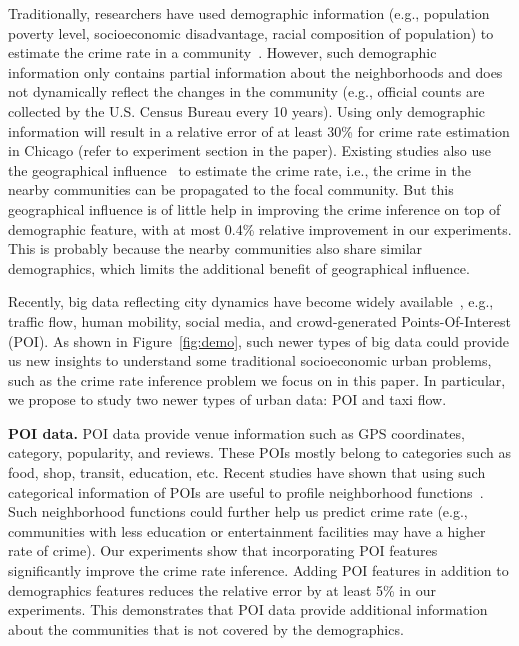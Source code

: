 Traditionally, researchers have used demographic information (e.g., population poverty level, socioeconomic disadvantage, racial composition of population) to estimate the crime rate in a community~\cite{GrSa09}. However,  such demographic information only contains partial information about the neighborhoods and does not dynamically reflect the changes in the community (e.g., official counts are collected by the U.S. Census Bureau every 10 years). Using only demographic information will result in a relative error of at least 30\% for crime rate estimation in Chicago (refer to experiment section in the paper). Existing studies also use the geographical influence~\cite{Ans02} to estimate the crime rate, i.e., the crime in the nearby communities can be propagated to the focal community. But this geographical influence is of little help in improving the crime inference on top of demographic feature, with at most 0.4\% relative improvement in our experiments. This is probably because the nearby communities also share similar demographics, which limits the additional benefit of geographical influence.



Recently, big data reflecting city dynamics have become widely available~\cite{ZCWY14}, e.g., traffic flow, human mobility, social media, and crowd-generated Points-Of-Interest (POI). As shown in Figure~\ref{fig:demo}, such newer types of big data could provide us new insights to understand some traditional socioeconomic urban problems, such as the crime rate inference problem we focus on in this paper. In particular, we propose to study two newer types of urban data: POI and taxi flow. 

\textbf{POI data.} POI data provide venue information such as GPS coordinates, category, popularity, and reviews. These POIs mostly belong to categories such as food, shop, transit, education, etc. Recent studies have shown that using such categorical information of POIs are useful to profile neighborhood functions~\cite{YZX12}. Such neighborhood functions could further help us predict crime rate (e.g., communities with less education or entertainment facilities may have a higher rate of crime). Our experiments show that incorporating POI features   significantly improve the crime rate inference. Adding POI features in addition to demographics features reduces the relative error by at least 5\% in our experiments. This demonstrates that POI data provide additional information about the communities that is not covered by the demographics.

